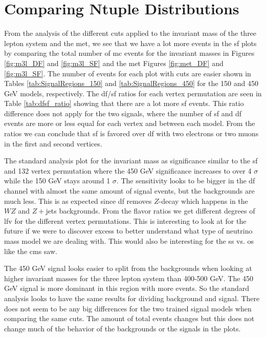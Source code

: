 \documentclass[a4paper, american, 12pt]{report}
\begin{document}
	\section{Comparing Ntuple Distributions}
	\label{sect:Discussion-CompNtuples}
	From the analysis of the different cuts applied to the invariant mass of the three lepton system and the \acrshort{met}, we see that we have a lot more events in the \acrshort{sf} plots by comparing the total number of \acrfull{mc} events for the invariant masses in Figures \ref{fig:m3l_DF} and \ref{fig:m3l_SF} and the \acrshort{met} Figures \ref{fig:met_DF} and \ref{fig:m3l_SF}. The number of events for each plot with cuts are easier shown in Tables \ref{tab:SignalRegions_150} and \ref{tab:SignalRegions_450} for the 150 and 450 GeV models, respectively. The \acrshort{df}/\acrshort{sf} ratios for each vertex permutation are seen in Table \ref{tab:dfsf_ratio} showing that there are a lot more \acrshort{sf} events. This ratio difference does not apply for the two signals, where the number of \acrshort{sf} and \acrshort{df} events are more or less equal for each vertex and between each model. From the ratios we can conclude that \acrshort{sf} is favored over \acrshort{df} with two electrons or two muons in the first and second vertices. 
	
	The standard analysis plot for the invariant mass as significance similar to the \acrshort{sf} and 132 vertex permutation where the 450 GeV significance increases to over 4 $\sigma$ while the 150 GeV stays around 1 $\sigma$. The sensitivity looks to be bigger in the \acrshort{df} channel with almost the same amount of signal events, but the backgrounds are much less. This is as expected since \acrshort{df} removes $Z$-decay which happens in the $WZ$ and $Z+$jets backgrounds. From the flavor ratios we get different degrees of \acrshort{lfv} for the different vertex permutations. This is interesting to look at for the future if we were to discover excess to better understand what type of neutrino mass model we are dealing with. This would also be interesting for the \acrshort{ss} vs. \acrshort{os} like the \acrshort{cms} saw.
	
	The 450 GeV signal looks easier to split from the backgrounds when looking at higher invariant masses for the three lepton system than 400-500 GeV. The 450 GeV signal is more dominant in this region with more events. So the standard analysis looks to have the same results for dividing background and signal. There does not seem to be any big differences for the two trained signal models when comparing the same cuts. The amount of total events changes but this does not change much of the behavior of the backgrounds or the signals in the plots.
	
\end{document}
